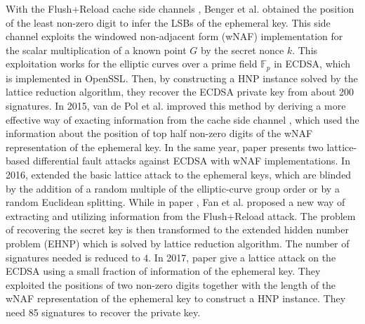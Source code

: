 With the Flush+Reload cache side channels \cite{flushreload},
	Benger et al. \cite{Benger2014} obtained the position of the least non-zero digit to infer the LSBs of the ephemeral key.
This side channel exploits
	the windowed non-adjacent form (wNAF) implementation \cite{GORDON1998129,Miyaji1997,Koyama1002,Solinas2000}
	for the scalar multiplication	
		of a known point $G$ by the secret nonce $k$.
This exploitation works for the elliptic curves over a prime field $\mathbb{F}_{p}$
			in ECDSA, which is implemented in OpenSSL\cite{openssl}.
Then,
	by constructing a HNP instance solved by the lattice reduction algorithm, they recover the ECDSA private key from about 200 signatures.
In 2015, van de Pol et al. improved this method by deriving a more effective way of exacting information from the cache side channel \cite{Van2015},
 which used the information about the position of top half non-zero digits of the wNAF representation of the ephemeral key.
In the same year, paper \cite{Cao2015} presents two lattice-based differential fault attacks against ECDSA with wNAF implementations.
In 2016, \cite{Dahmun2016}  extended the basic lattice attack to the ephemeral keys,  which are blinded by the addition of a random multiple of the elliptic-curve group order or by a random Euclidean splitting.
While in paper \cite{Fan2016}, Fan et al. proposed a new way of extracting and utilizing information from the Flush+Reload attack. The problem of recovering the
secret key is then transformed to the extended hidden number problem (EHNP) which is solved by lattice reduction algorithm. The number of signatures needed is reduced to $4$.
In 2017, paper \cite{Wang2017} give a lattice attack on the ECDSA using
 a small fraction of information of the ephemeral key.
They exploited the positions of two non-zero digits together with the length of the wNAF representation of the ephemeral key to construct a HNP instance. They need 85 signatures to recover the private key.


